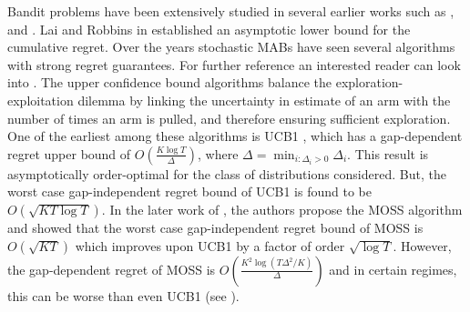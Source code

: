 
	Bandit problems have been extensively studied in several earlier works such as \citet{thompson1933likelihood}, \citet{robbins1952some} and \citet{lai1985asymptotically}. Lai and Robbins in  \citet{lai1985asymptotically} established an asymptotic lower bound for the cumulative regret. Over the years stochastic MABs have seen several algorithms with strong regret guarantees. For further reference an interested reader can look into \citet{bubeck2012regret}. The upper confidence bound algorithms balance the exploration-exploitation dilemma by linking the uncertainty in estimate of an arm with the number of times an arm is pulled, and therefore ensuring sufficient exploration. One of the earliest among these algorithms is UCB1 \citep{auer2002finite}, which has a gap-dependent regret upper bound of  $O\left(\frac{K\log T}{\Delta}\right)$, where $\Delta = \min_{i:\Delta_i>0} \Delta_i$. This result is asymptotically order-optimal for the class of distributions considered. But, the worst case gap-independent regret bound of UCB1 is found to be  $O \left(\sqrt{KT\log T}\right)$. In the later work of \citet{audibert2009minimax}, the authors propose the MOSS algorithm and showed that the worst case gap-independent regret bound of MOSS is $O\left( \sqrt{KT} \right)$ which improves upon UCB1 by a factor of order $\sqrt{\log T}$. However, the gap-dependent regret of MOSS is $O\left( \frac{K^{2}\log\left(T\Delta^{2}/K\right)}{\Delta}\right)$ and in certain regimes, this can be worse than even UCB1 (see \citet{audibert2009minimax,lattimore2015optimally}).
	
